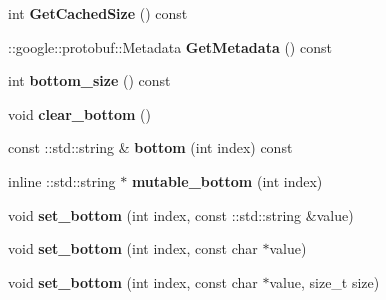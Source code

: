 \begin{DoxyCompactItemize}
\item 
\mbox{\label{classcaffe_1_1_v1_layer_parameter_a19dab1e090769cb87c0d019ee7c6e434}} 
int {\bfseries Get\+Cached\+Size} () const
\item 
\mbox{\label{classcaffe_1_1_v1_layer_parameter_a575d2a72160acdec911c018fceb8ad31}} 
\+::google\+::protobuf\+::\+Metadata {\bfseries Get\+Metadata} () const
\item 
\mbox{\label{classcaffe_1_1_v1_layer_parameter_a7bc0bb47b26ab3d404f8f7bbc786dd8d}} 
int {\bfseries bottom\+\_\+size} () const
\item 
\mbox{\label{classcaffe_1_1_v1_layer_parameter_a1582fd0b2e2db83a7091164fe8894b7a}} 
void {\bfseries clear\+\_\+bottom} ()
\item 
\mbox{\label{classcaffe_1_1_v1_layer_parameter_aa2cf70a4dae1587fc71576a716f66e78}} 
const \+::std\+::string \& {\bfseries bottom} (int index) const
\item 
\mbox{\label{classcaffe_1_1_v1_layer_parameter_a22d4d2749de1ad1a3486bc6080d20729}} 
inline \+::std\+::string $\ast$ {\bfseries mutable\+\_\+bottom} (int index)
\item 
\mbox{\label{classcaffe_1_1_v1_layer_parameter_a8ec0bfc5e7298b0cc71f845d8df22e6c}} 
void {\bfseries set\+\_\+bottom} (int index, const \+::std\+::string \&value)
\item 
\mbox{\label{classcaffe_1_1_v1_layer_parameter_a9d91b1c781df8bef436c894e32ef1755}} 
void {\bfseries set\+\_\+bottom} (int index, const char $\ast$value)
\item 
\mbox{\label{classcaffe_1_1_v1_layer_parameter_a376fed34847d15d8dc1df2b9e3c5bc73}} 
void {\bfseries set\+\_\+bottom} (int index, const char $\ast$value, size\+\_\+t size)
\item 
\mbox{\label{classcaffe_1_1_v1_layer_parameter_a97c788f29c1402982270f7364a34e16c}} 

\end{DoxyCompactItemize}
